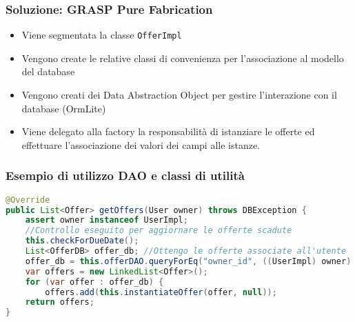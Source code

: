 \begin{frame}
    \frametitle{Soluzione: GRASP Pure Fabrication}
    \begin{minipage}{.48\textwidth}
        \begin{itemize}
            \item<1-> Viene segmentata la classe \texttt{OfferImpl}
            \item <2-> Vengono create le relative classi di convenienza per l'associazione al modello del database
            \item <3-> Vengono creati dei Data Abstraction Object per gestire l'interazione con il database (OrmLite)
            \item<4-> Viene delegato alla factory la responsabilità di istanziare le offerte ed effettuare l'associazione dei valori dei campi alle istanze.
        \end{itemize}
    \end{minipage}
    \begin{minipage}{.47\textwidth}
        \begin{figure}
            \centering
        \end{figure}
    \end{minipage}
\end{frame}

\begin{frame}[fragile]
    \frametitle{Esempio di utilizzo DAO e classi di utilità}
    \lstset{style=java}
    \begin{lstlisting}[language=java, caption={OfferFactoryImpl\#getOffers()}]
@Override
public List<Offer> getOffers(User owner) throws DBException {
    assert owner instanceof UserImpl;
    //Controllo eseguito per aggiornare le offerte scadute
    this.checkForDueDate();
    List<OfferDB> offer_db; //Ottengo le offerte associate all'utente
    offer_db = this.offerDAO.queryForEq("owner_id", ((UserImpl) owner).getDbData());
    var offers = new LinkedList<Offer>();
    for (var offer : offer_db) {
        offers.add(this.instantiateOffer(offer, null));
    return offers;
}
    \end{lstlisting}
\end{frame}